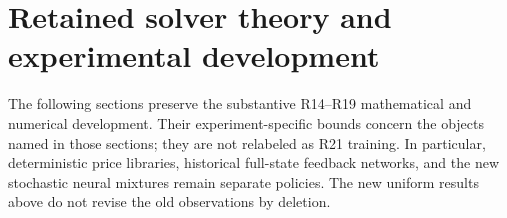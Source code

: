 




\section{Retained solver theory and experimental development}
The following sections preserve the substantive R14--R19 mathematical and numerical development. Their experiment-specific bounds concern the objects named in those sections; they are not relabeled as R21 training. In particular, deterministic price libraries, historical full-state feedback networks, and the new stochastic neural mixtures remain separate policies. The new uniform results above do not revise the old observations by deletion.
















